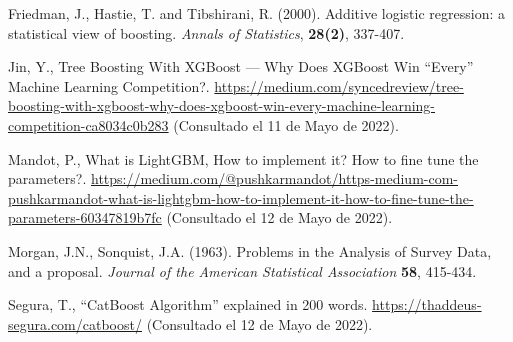 \documentclass[12pt,twoside]{article}
\begin{document}
\begin{thebibliography}{100}
 Friedman, J., Hastie, T. and Tibshirani, R. (2000). Additive logistic regression: a statistical view of boosting. \textit{Annals of Statistics}, \textbf{28(2)}, 337-407.


 Jin, Y., Tree Boosting With XGBoost — Why Does XGBoost Win ``Every'' Machine Learning Competition?. \url{https://medium.com/syncedreview/tree-boosting-with-xgboost-why-does-xgboost-win-every-machine-learning-competition-ca8034c0b283} (Consultado el 11 de Mayo de 2022).



 Mandot, P., What is LightGBM, How to implement it? How to fine tune the parameters?. \url{https://medium.com/@pushkarmandot/https-medium-com-pushkarmandot-what-is-lightgbm-how-to-implement-it-how-to-fine-tune-the-parameters-60347819b7fc} (Consultado el 12 de Mayo de 2022).

 Morgan, J.N., Sonquist, J.A. (1963). Problems in the Analysis of Survey Data, and a proposal. \textit{Journal of the American Statistical Association} \textbf{58}, 415-434.

 Segura, T., ``CatBoost Algorithm'' explained in 200 words. \url{https://thaddeus-segura.com/catboost/} (Consultado el 12 de Mayo de 2022).








\end{thebibliography}
\end{document}
